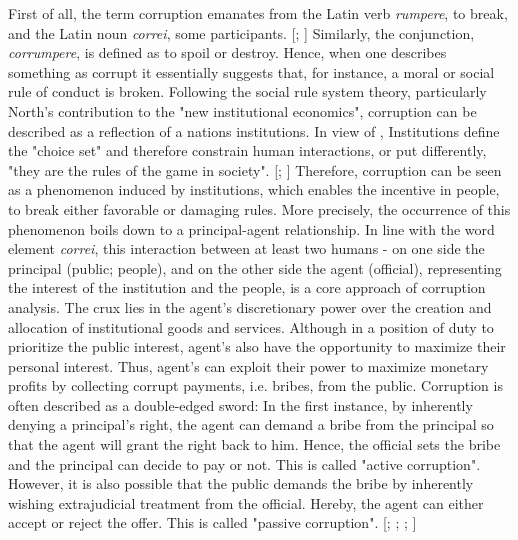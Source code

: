 First of all, the term corruption emanates from the Latin verb {\it rumpere}, to break, and the Latin noun \textit{correi}, some participants. [\citealp[p. 8]{tanzi1994}; \citealp[p. 17]{phd-corruption}] Similarly, the conjunction, \textit{corrumpere}, is defined as to spoil or destroy. \citep[p. 17]{klitgaard2015addressing}
Hence, when one describes something as corrupt it essentially suggests that, for instance, a moral or social rule of conduct is broken. \citep[p. 8]{tanzi1994} Following the social rule system theory, particularly North's contribution to the "new institutional economics", corruption can be described as a reflection of a nations institutions. \citep[p. 20]{north1990transaction,svensson2005eight} In view of \citeauthor{north1990transaction}, Institutions define the "choice set" and therefore constrain human interactions, or put differently,  "they are the rules of the game in society". [\citealp[p. 1]{north1990transaction}; \citealp[p. 97]{north1991institutions}] Therefore, corruption can be seen as a phenomenon induced by institutions, which enables the incentive in people, to break either favorable or damaging rules. \citep[p. 20]{svensson2005eight} 
More precisely, the occurrence of this phenomenon boils down to a principal-agent relationship. In line with the word element \textit{correi}, this interaction between at least two humans - on one side the principal (public; people), and on the other side the agent (official), representing the interest of the institution and the people, is a  core approach of corruption analysis. The crux lies in the agent's discretionary power over the creation and allocation of institutional goods and services. Although in a position of duty to prioritize the public interest, agent's also have the opportunity to maximize their personal interest. Thus, agent's can exploit their power to maximize monetary profits by collecting corrupt payments, i.e. bribes, from the public. Corruption is often described as a double-edged sword: In the first instance, by inherently denying a principal's right, the agent can demand a bribe from the principal so that the agent will grant the right back to him. Hence, the official sets the bribe and the principal can decide to pay or not. This is called "active corruption". However, it is also possible that the public demands the bribe by inherently wishing extrajudicial treatment from the official. Hereby, the agent can either accept or reject the offer. This is called "passive corruption". [\citealp[p. 422]{kaufmann1997privatization}; \citealp[p.223]{rose2010law};
 \citealp[p. 1321]{bardhan1997corruption}; \citealp[p. 104]{capasso2018active}]
